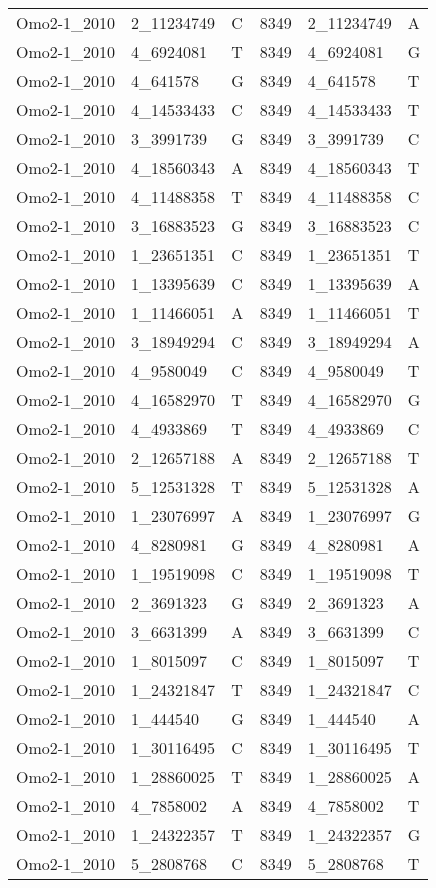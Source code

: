 \begin{center}
\begin{longtable}{|l|l|l|l|l|l|}
Omo2-1\_2010&2\_11234749&C&8349&2\_11234749&A\\
Omo2-1\_2010&4\_6924081&T&8349&4\_6924081&G\\
Omo2-1\_2010&4\_641578&G&8349&4\_641578&T\\
Omo2-1\_2010&4\_14533433&C&8349&4\_14533433&T\\
Omo2-1\_2010&3\_3991739&G&8349&3\_3991739&C\\
Omo2-1\_2010&4\_18560343&A&8349&4\_18560343&T\\
Omo2-1\_2010&4\_11488358&T&8349&4\_11488358&C\\
Omo2-1\_2010&3\_16883523&G&8349&3\_16883523&C\\
Omo2-1\_2010&1\_23651351&C&8349&1\_23651351&T\\
Omo2-1\_2010&1\_13395639&C&8349&1\_13395639&A\\
Omo2-1\_2010&1\_11466051&A&8349&1\_11466051&T\\
Omo2-1\_2010&3\_18949294&C&8349&3\_18949294&A\\
Omo2-1\_2010&4\_9580049&C&8349&4\_9580049&T\\
Omo2-1\_2010&4\_16582970&T&8349&4\_16582970&G\\
Omo2-1\_2010&4\_4933869&T&8349&4\_4933869&C\\
Omo2-1\_2010&2\_12657188&A&8349&2\_12657188&T\\
Omo2-1\_2010&5\_12531328&T&8349&5\_12531328&A\\
Omo2-1\_2010&1\_23076997&A&8349&1\_23076997&G\\
Omo2-1\_2010&4\_8280981&G&8349&4\_8280981&A\\
Omo2-1\_2010&1\_19519098&C&8349&1\_19519098&T\\
Omo2-1\_2010&2\_3691323&G&8349&2\_3691323&A\\
Omo2-1\_2010&3\_6631399&A&8349&3\_6631399&C\\
Omo2-1\_2010&1\_8015097&C&8349&1\_8015097&T\\
Omo2-1\_2010&1\_24321847&T&8349&1\_24321847&C\\
Omo2-1\_2010&1\_444540&G&8349&1\_444540&A\\
Omo2-1\_2010&1\_30116495&C&8349&1\_30116495&T\\
Omo2-1\_2010&1\_28860025&T&8349&1\_28860025&A\\
Omo2-1\_2010&4\_7858002&A&8349&4\_7858002&T\\
Omo2-1\_2010&1\_24322357&T&8349&1\_24322357&G\\
Omo2-1\_2010&5\_2808768&C&8349&5\_2808768&T\\

\end{longtable}
\end{center}
